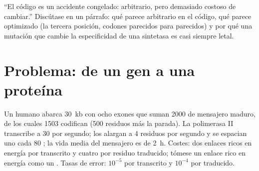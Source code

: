 \begin{exercise}[$\star\star\star$]\label{exo:b1:gene-expression:12}
``El código es un accidente congelado: arbitrario, pero demasiado costoso de
cambiar.'' Discútase en un párrafo: qué parece arbitrario en el código, qué
parece optimizado (la tercera posición, codones parecidos para 
parecidos) y por qué una mutación que cambie la especificidad de una
sintetasa es casi siempre letal.
\end{exercise}

\section{Problema: de un gen a una proteína}

\begin{problem}
\label{pb:b1:gene-expression:1}
Un  humano abarca \qty{30}{kb} con ocho exones que suman \qty{2000}{}
 de mensajero maduro, de los cuales \qty{1503}{} codifican (500
residuos más la parada). La polimerasa II transcribe a \qty{30}{}
 por segundo; los  alargan a \qty{4}{} residuos por
segundo y se espacian uno cada \qty{80}{} ; la vida media del
mensajero es de \qty{2}{h}. Costes: dos enlaces ricos en energía por
 transcrito y cuatro por residuo traducido; tómese un enlace rico
en energía como un . Tasas de error: $10^{-5}$ por  transcrito
y $10^{-4}$ por  traducido.


\end{problem}
